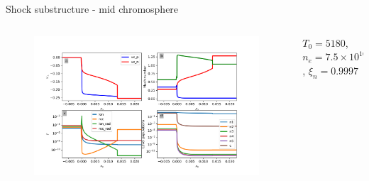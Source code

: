 \documentclass[10pt,aspectratio=169,usenames,dvipsnames]{beamer}
\begin{document}
\begin{frame}{Shock substructure - mid chromosphere}
\begin{columns}
\begin{column}{0.8\textwidth}
\begin{figure}
    \includegraphics[width=0.95\linewidth,clip=true,trim=1.2cm 0.8cm 0.9cm 0.8cm]{2023ECRW/Figures/shocksub2_plot_midc_corrected.png}
    \label{fig:upperchromocontext}
\end{figure}
\end{column}
\begin{column}{0.2\textwidth}
    $T_0=5180$, $n_e=7.5\times 10^{16}$, $\xi_n=0.9997$
\end{column}
\end{columns}
\end{frame}
\end{document}
